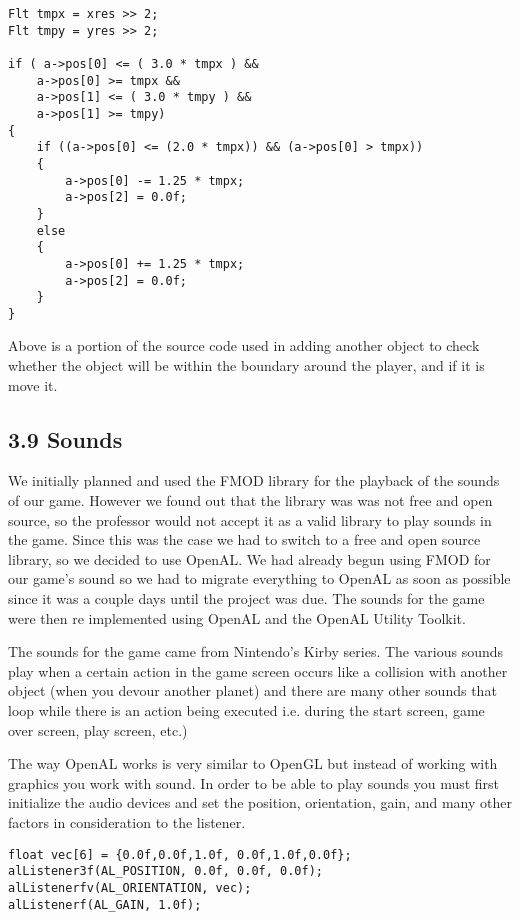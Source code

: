 \documentclass[12pt]{report}
\begin{document}
\begin{lstlisting}
Flt tmpx = xres >> 2;
Flt tmpy = yres >> 2;

if ( a->pos[0] <= ( 3.0 * tmpx ) &&
	a->pos[0] >= tmpx &&
	a->pos[1] <= ( 3.0 * tmpy ) &&
	a->pos[1] >= tmpy)
{
	if ((a->pos[0] <= (2.0 * tmpx)) && (a->pos[0] > tmpx))
	{
		a->pos[0] -= 1.25 * tmpx;
		a->pos[2] = 0.0f;
	}
	else
	{
		a->pos[0] += 1.25 * tmpx;
		a->pos[2] = 0.0f;
	}
}
\end{lstlisting}
\noindent Above is a portion of the source code used in adding another object to check whether the object will be within the boundary around the player, and if it is move it.

\newpage
\subsection*{3.9 Sounds}
We initially planned and used the FMOD library for the playback of the sounds of our game. However we found out that the library was was not free and open source, so the professor would not accept it as a valid library to play sounds in the game. Since this was the case we had to switch to a free and open source library, so we decided to use OpenAL. We had already begun using FMOD for our game's sound so we had to migrate everything to OpenAL as soon as possible since it was a couple days until the project was due. The sounds for the game were then re implemented using OpenAL and the OpenAL Utility Toolkit. \bigskip

The sounds for the game came from Nintendo's Kirby series. The various sounds play when a certain action in the game screen occurs like a collision with another object (when you devour another planet) and there are many other sounds that loop while there is an action being executed i.e. during the start screen, game over screen, play screen, etc.) \bigskip

The way OpenAL works is very similar to OpenGL but instead of working with graphics you work with sound. In order to be able to play sounds you must first initialize the audio devices and set the position, orientation, gain, and many other factors in consideration to the listener. \bigskip

\begin{lstlisting}
float vec[6] = {0.0f,0.0f,1.0f, 0.0f,1.0f,0.0f};
alListener3f(AL_POSITION, 0.0f, 0.0f, 0.0f);
alListenerfv(AL_ORIENTATION, vec);
alListenerf(AL_GAIN, 1.0f);
\end{lstlisting}
\end{document}

